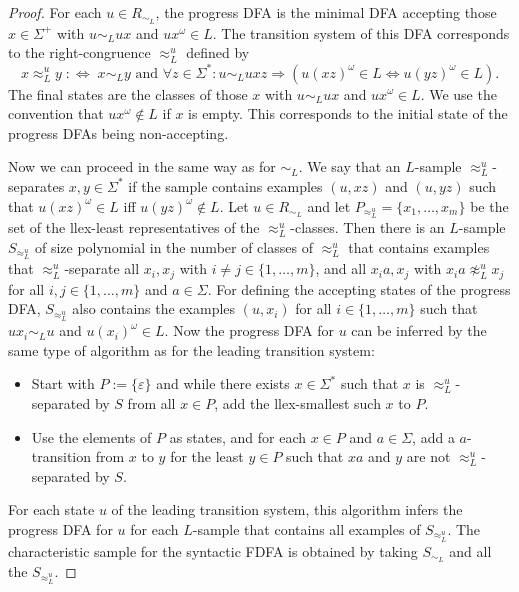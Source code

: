 \documentclass[a4paper,USenglish,cleveref,autoref,thm-restate]{lipics-v2021}
\begin{document}
{\begin{proof}
For each $u \in R_{\sim_L}$, the progress DFA is the minimal DFA accepting those $x \in \Sigma^+$ with $u \sim_L ux$ and $ux^\omega \in L$. The transition system of this DFA corresponds to the right-congruence $\approx_L^u$ defined by
\[
x \approx_L^u y \; :\Leftrightarrow \; x \sim_L y
\text{ and } \forall z \in \Sigma^*: u \sim_L uxz \Rightarrow (u(xz)^\omega \in L \Leftrightarrow u(yz)^\omega \in L).
\]
The final states are the classes of those $x$ with $u \sim_L ux$ and $ux^\omega \in L$. 
We use the convention that $ux^\omega \notin L$ if $x$ is empty. This corresponds to the initial state of the progress DFAs being non-accepting.

Now we can proceed in the same way as for $\sim_L$. We say that an $L$-sample $\approx_L^u$-separates $x,y \in \Sigma^*$ if the sample contains examples $(u,xz)$ and $(u,yz)$ such that $u(xz)^\omega \in L$ iff $u(yz)^\omega \notin L$. 
Let $u \in R_{\sim_L}$ and let $P_{\approx_L^u} = \{x_1, \ldots, x_m\}$ be the set of the llex-least representatives of the $\approx_L^u$-classes. Then there is an  $L$-sample $S_{\approx_L^u}$ of size polynomial in the number of classes of $\approx_L^u$ that contains examples that $\approx_L^u$-separate all $x_i,x_j$ with $i \not=j \in \{1, \ldots, m\}$, and all $x_ia,x_j$ with $x_ia \not\approx_L^u x_j$ for all $i,j \in \{1, \ldots, m\}$ and $a \in \Sigma$. For defining the accepting states of the progress DFA,  $S_{\approx_L^u}$ also contains the examples $(u,x_i)$ for all $i \in \{1,\ldots,m\}$ such that $ux_i \sim_L u$ and $u(x_i)^\omega \in L$.
Now the progress DFA for $u$ can be inferred by the same type of algorithm as for the leading transition system:
\begin{itemize}
\item Start with $P := \{\varepsilon\}$ and while there exists $x \in \Sigma^*$ such that $x$ is $\approx_L^u$-separated by $S$ from all $x \in P$, add the llex-smallest such $x$ to $P$.
\item Use the elements of $P$ as states, and for each $x \in P$ and $a \in \Sigma$, add a $a$-transition from $x$ to $y$ for the least $y \in P$ such that $xa$ and $y$ are not $\approx_L^u$-separated by $S$.
\end{itemize}
For each state $u$ of the leading transition system, this algorithm infers the progress DFA for $u$ for each $L$-sample that contains all examples of $S_{\approx_L^u}$.
The characteristic sample for the syntactic FDFA is obtained by taking $S_{\sim_L}$ and all the $S_{\approx_L^u}$.
\end{proof}


}
\end{document}
